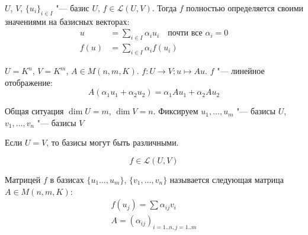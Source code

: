 \begin{Rem}
	$U$, $V$, $\{u_i\}_{i \in I}$ "--- базис $U$, $f \in \mathcal{L}(U, V)$.
	Тогда $f$ полностью определяется своими значениями на базисных векторах:
	\begin{align*}
		u &= \sum_{i \in I} \alpha_i u_i \quad \text{почти все $\alpha_i = 0$} \\
		f(u) &= \sum_{i \in I}\alpha_if(u_i)
	\end{align*}
\end{Rem}

\begin{exmp}
	$U = K^n$, $V = K^m$, $A \in M(n, m, K)$.
	$f \colon U \to V; u \mapsto Au$.
	$f$ "--- линейное отображение:
	\[ A(\alpha_1 u_1 + \alpha_2 u_2) = \alpha_1Au_1 + \alpha_2 A u_2 \]

	Общая ситуация $\dim U = m$, $\dim V = n$.
	Фиксируем $u_1, \dots, u_m$ "--- базисы $U$, $v_1, \dots, v_n$ "--- базисы $V$
	\begin{Rem}
		Если $U = V$, то базисы могут быть различными.
	\end{Rem}
	\[ f \in \mathcal{L}(U,V) \]
\end{exmp}

\begin{Def}
	Матрицей $f$ в базисах $\{u_1 \dots, u_m\}$, $\{v_1, \dots, v_n\}$ называется следующая матрица $A \in M(n, m, K)$:
	\begin{gather*}
		f(u_j) = \sum\alpha_{ij}v_i \\
		A = (\alpha_{ij})_{i = 1..n, j = 1..m}
	\end{gather*}
\end{Def}


